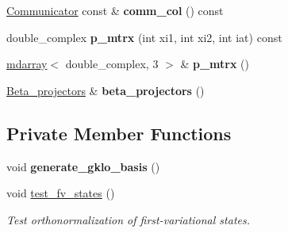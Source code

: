 \begin{DoxyCompactItemize}
\item 
\hypertarget{classsirius_1_1_k__point_ab037b2f1d1af97f5eefa212b010b8bf1}{}\hyperlink{classsddk_1_1_communicator}{Communicator} const \& {\bfseries comm\+\_\+col} () const \label{classsirius_1_1_k__point_ab037b2f1d1af97f5eefa212b010b8bf1}

\item 
\hypertarget{classsirius_1_1_k__point_aeb501b6b7961d4502c72b9e6ef5d84d3}{}double\+\_\+complex {\bfseries p\+\_\+mtrx} (int xi1, int xi2, int iat) const \label{classsirius_1_1_k__point_aeb501b6b7961d4502c72b9e6ef5d84d3}

\item 
\hypertarget{classsirius_1_1_k__point_a4ee5a09fb3ecc4e8131f31051e3e6853}{}\hyperlink{classsddk_1_1mdarray}{mdarray}$<$ double\+\_\+complex, 3 $>$ \& {\bfseries p\+\_\+mtrx} ()\label{classsirius_1_1_k__point_a4ee5a09fb3ecc4e8131f31051e3e6853}

\item 
\hypertarget{classsirius_1_1_k__point_a321a3149829b0cac934e41c4297ba915}{}\hyperlink{classsirius_1_1_beta__projectors}{Beta\+\_\+projectors} \& {\bfseries beta\+\_\+projectors} ()\label{classsirius_1_1_k__point_a321a3149829b0cac934e41c4297ba915}

\end{DoxyCompactItemize}
\subsection*{Private Member Functions}
\begin{DoxyCompactItemize}
\item 
\hypertarget{classsirius_1_1_k__point_a2ced090b24eaa4ac4a6644e53e7ff383}{}void {\bfseries generate\+\_\+gklo\+\_\+basis} ()\label{classsirius_1_1_k__point_a2ced090b24eaa4ac4a6644e53e7ff383}

\item 
void \hyperlink{classsirius_1_1_k__point_a74f1994d6b60aededa1ccb7aad3b8815}{test\+\_\+fv\+\_\+states} ()
\begin{DoxyCompactList}\small\item\em Test orthonormalization of first-\/variational states. \end{DoxyCompactList}\end{DoxyCompactItemize}

